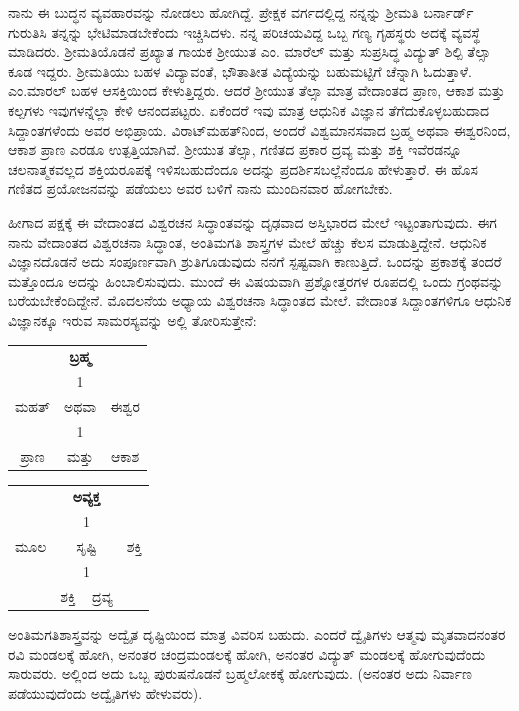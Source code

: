 ನಾನು ಈ ಬುದ್ಧನ ವ್ಯವಹಾರವನ್ನು ನೋಡಲು ಹೋಗಿದ್ದೆ. ಪ್ರೇಕ್ಷಕ ವರ್ಗದಲ್ಲಿದ್ದ ನನ್ನನ್ನು ಶ‍್ರೀಮತಿ ಬರ್ನಾರ್ಡ್ ಗುರುತಿಸಿ ತನ್ನನ್ನು ಭೇಟಿಮಾಡಬೇಕೆಂದು ಇಚ್ಚಿಸಿದಳು. ನನ್ನ ಪರಿಚಯವಿದ್ದ ಒಬ್ಬ ಗಣ್ಯ ಗೃಹಸ್ಥರು ಅದಕ್ಕೆ ವ್ಯವಸ್ಥೆ ಮಾಡಿದರು. ಶ‍್ರೀಮತಿಯೊಡನೆ ಪ್ರಖ್ಯಾತ ಗಾಯಕ ಶ‍್ರೀಯುತ ಎಂ. ಮಾರೆಲ್ ಮತ್ತು ಸುಪ್ರಸಿದ್ಧ ವಿದ್ಯುತ್ ಶಿಲ್ಪಿ ತೆಲ್ಸಾ ಕೂಡ ಇದ್ದರು. ಶ‍್ರೀಮತಿಯು ಬಹಳ ವಿದ್ಯಾವಂತೆ, ಭೌತಾತೀತ ವಿದ್ಯೆಯನ್ನು ಬಹುಮಟ್ಟಿಗೆ ಚೆನ್ನಾಗಿ ಓದುತ್ತಾಳೆ. ಎಂ.ಮಾರಲ್ ಬಹಳ ಆಸಕ್ತಿಯಿಂದ ಕೇಳುತ್ತಿದ್ದರು. ಆದರೆ ಶ‍್ರೀಯುತ ತೆಲ್ಸಾ ಮಾತ್ರ ವೇದಾಂತದ ಪ್ರಾಣ, ಆಕಾಶ ಮತ್ತು ಕಲ್ಪಗಳು ಇವುಗಳನ್ನೆಲ್ಲಾ ಕೇಳಿ ಆನಂದಪಟ್ಟರು. ಏಕೆಂದರೆ ಇವು ಮಾತ್ರ ಆಧುನಿಕ ವಿಜ್ಞಾನ ತೆಗೆದುಕೊಳ್ಳಬಹುದಾದ ಸಿದ್ದಾಂತಗಳೆಂದು ಅವರ ಅಭಿಪ್ರಾಯ. ವಿರಾಟ್‌ಮಹತ್‌ನಿಂದ, ಅಂದರೆ ವಿಶ್ವಮಾನಸವಾದ ಬ್ರಹ್ಮ ಅಥವಾ ಈಶ್ವರನಿಂದ, ಆಕಾಶ ಪ್ರಾಣ ಎರಡೂ ಉತ್ಪತ್ತಿಯಾಗಿವೆ. ಶ‍್ರೀಯುತ ತೆಲ್ಸಾ, ಗಣಿತದ ಪ್ರಕಾರ ದ್ರವ್ಯ ಮತ್ತು ಶಕ್ತಿ ಇವೆರಡನ್ನೂ ಚಲನಾತ್ಮಕವಲ್ಲದ ಶಕ್ತಿಯರೂಪಕ್ಕೆ ಇಳಿಸಬಹುದೆಂದೂ ಅದನ್ನು ಪ್ರದರ್ಶಿಸಬಲ್ಲೆನೆಂದೂ ಹೇಳುತ್ತಾರೆ. ಈ ಹೊಸ ಗಣಿತದ ಪ್ರಯೋಜನವನ್ನು ಪಡೆಯಲು ಅವರ ಬಳಿಗೆ ನಾನು ಮುಂದಿನವಾರ ಹೋಗಬೇಕು.

ಹೀಗಾದ ಪಕ್ಷಕ್ಕೆ ಈ ವೇದಾಂತದ ವಿಶ್ವರಚನ ಸಿದ್ಧಾಂತವನ್ನು ದೃಢವಾದ ಅಸ್ತಿಭಾರದ ಮೇಲೆ ಇಟ್ಟಂತಾಗುವುದು. ಈಗ ನಾನು ವೇದಾಂತದ ವಿಶ್ವರಚನಾ ಸಿದ್ಧಾಂತ, ಅಂತಿಮಗತಿ ಶಾಸ್ತ್ರಗಳ ಮೇಲೆ ಹೆಚ್ಚು ಕೆಲಸ ಮಾಡುತ್ತಿದ್ದೇನೆ. ಆಧುನಿಕ ವಿಜ್ಞಾನದೊಡನೆ ಅದು ಸಂಪೂರ್ಣವಾಗಿ ಶ್ರುತಿಗೂಡುವುದು ನನಗೆ ಸ್ಪಷ್ಟವಾಗಿ ಕಾಣುತ್ತಿದೆ. ಒಂದನ್ನು ಪ್ರಕಾಶಕ್ಕೆ ತಂದರೆ ಮತ್ತೊಂದೂ ಅದನ್ನು ಹಿಂಬಾಲಿಸುವುದು. ಮುಂದೆ ಈ ವಿಷಯವಾಗಿ ಪ್ರಶ್ನೋತ್ತರಗಳ ರೂಪದಲ್ಲಿ ಒಂದು ಗ್ರಂಥವನ್ನು ಬರೆಯಬೇಕೆಂದಿದ್ದೇನೆ. ಮೊದಲನೆಯ ಅಧ್ಯಾಯ ವಿಶ್ವರಚನಾ ಸಿದ್ಧಾಂತದ  ಮೇಲೆ. ವೇದಾಂತ ಸಿದ್ದಾಂತಗಳಿಗೂ ಆಧುನಿಕ ವಿಜ್ಞಾನಕ್ಕೂ ಇರುವ ಸಾಮರಸ್ಯವನ್ನು ಅಲ್ಲಿ ತೋರಿಸುತ್ತೇನೆ:

\vspace{-0.2cm}

\begin{center}
\begin{tabular}{c@{$\;$}c@{$\;$}c}
& \textbf{ಬ್ರಹ್ಮ } &\\
& 1 & \\
ಮಹತ್ & ಅಥವಾ & ಈಶ್ವರ \\
& 1 & \\
ಪ್ರಾಣ & ಮತ್ತು &  ಆಕಾಶ 
\end{tabular}
\qquad 
\begin{tabular}{c@{}c@{}c}
& \textbf{ಅವ್ಯಕ್ತ} &\\
& 1 & \\
ಮೂಲ  & ಸೃಷ್ಟಿ  & ಶಕ್ತಿ \\
& 1 & \\
& ಶಕ್ತಿ ~  ದ್ರವ್ಯ & 
\end{tabular}
\end{center}

\vspace{-0.2cm}

ಅಂತಿಮಗತಿಶಾಸ್ತ್ರವನ್ನು  ಅದ್ವೈತ ದೃಷ್ಟಿಯಿಂದ ಮಾತ್ರ ವಿವರಿಸ ಬಹುದು. ಎಂದರೆ ದ್ವೈತಿಗಳು ಆತ್ಮವು ಮೃತವಾದನಂತರ ರವಿ ಮಂಡಲಕ್ಕೆ ಹೋಗಿ, ಅನಂತರ ಚಂದ್ರಮಂಡಲಕ್ಕೆ ಹೋಗಿ, ಅನಂತರ ವಿದ್ಯುತ್ ಮಂಡಲಕ್ಕೆ ಹೋಗುವುದೆಂದು ಸಾರುವರು. ಅಲ್ಲಿಂದ ಅದು ಒಬ್ಬ ಪುರುಷನೊಡನೆ ಬ್ರಹ್ಮಲೋಕಕ್ಕೆ ಹೋಗುವುದು. (ಅನಂತರ ಅದು ನಿರ್ವಾಣ ಪಡೆಯುವುದೆಂದು ಅದ್ವೈತಿಗಳು ಹೇಳುವರು).

